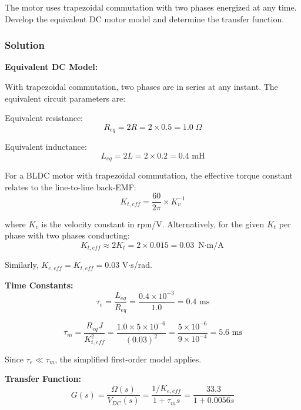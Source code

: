 The motor uses trapezoidal commutation with two phases energized at any time. Develop the equivalent DC motor model and determine the transfer function.

\subsubsection{Solution}

\textbf{Equivalent DC Model:}

With trapezoidal commutation, two phases are in series at any instant. The equivalent circuit parameters are:

Equivalent resistance:
\begin{equation}
    R_{eq} = 2R = 2 \times 0.5 = 1.0 \; \Omega
\end{equation}

Equivalent inductance:
\begin{equation}
    L_{eq} = 2L = 2 \times 0.2 = 0.4 \text{ mH}
\end{equation}

For a BLDC motor with trapezoidal commutation, the effective torque constant relates to the line-to-line back-EMF:
\begin{equation}
    K_{t,eff} = \frac{60}{2\pi} \times K_v^{-1}
\end{equation}

where $K_v$ is the velocity constant in rpm/V. Alternatively, for the given $K_t$ per phase with two phases conducting:
\begin{equation}
    K_{t,eff} \approx 2 K_t = 2 \times 0.015 = 0.03 \text{ N$\cdot$m/A}
\end{equation}

Similarly, $K_{e,eff} = K_{t,eff} = 0.03$ V$\cdot$s/rad.

\textbf{Time Constants:}
\begin{equation}
    \tau_e = \frac{L_{eq}}{R_{eq}} = \frac{0.4 \times 10^{-3}}{1.0} = 0.4 \text{ ms}
\end{equation}

\begin{equation}
    \tau_m = \frac{R_{eq} J}{K_{t,eff}^2} = \frac{1.0 \times 5 \times 10^{-6}}{(0.03)^2} = \frac{5 \times 10^{-6}}{9 \times 10^{-4}} = 5.6 \text{ ms}
\end{equation}

Since $\tau_e \ll \tau_m$, the simplified first-order model applies.

\textbf{Transfer Function:}
\begin{equation}
    G(s) = \frac{\Omega(s)}{V_{DC}(s)} = \frac{1/K_{e,eff}}{1 + \tau_m s} = \frac{33.3}{1 + 0.0056s}
\end{equation}

